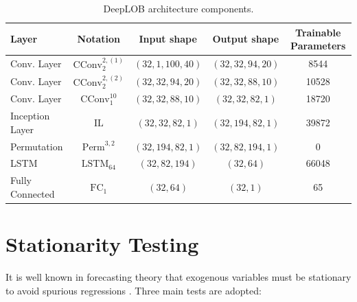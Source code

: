 \documentclass[10pt,a4paper,oneside]{article}
\DeclareMathOperator{\perm}{Perm}
\DeclareMathOperator{\fullyconnected}{FC}
\DeclareMathOperator{\lstm}{LSTM}
\begin{document}
\begin{table}[htb]
  \caption{DeepLOB architecture components.}
  \label{tab:deeplob}

\centering
\begin{tabular}{@{}lcccc@{}}
\toprule
Layer           & Notation           & Input shape        & Output shape          & Trainable Parameters  \\ \midrule
Conv. Layer     & $\mathrm{CConv}^{2, (1)}_{2}$ & $(32, 1, 100, 40)$ & $(32, 32, 94, 20)$   & 8544                  \\
Conv. Layer     & $\mathrm{CConv}^{2, (2)}_2$   & $(32, 32, 94, 20)$ & $(32,  32,  88, 10)$ & 10528                 \\
Conv. Layer     & $\mathrm{CConv}^{10}_1$       & $(32, 32, 88, 10)$ & $(32, 32, 82, 1)$    & 18720                 \\
Inception Layer & $\mathrm{IL}$               & $(32,  32, 82, 1)$ & $(32, 194, 82, 1)$   & 39872                 \\
Permutation     & $\perm^{3,2}$        & $(32, 194, 82, 1)$ & $(32, 82, 194, 1)$   & 0                     \\
LSTM            & $\lstm_{64}$        & $(32, 82, 194)$    & $(32, 64)$           & 66048                 \\ 
Fully Connected & $\fullyconnected_{1}$    & $(32, 64)$         & $(32, 1)$            & 65   \\\bottomrule
\end{tabular}

\end{table}



\clearpage
\section{Stationarity Testing}
\label{ap:stationarity_testing}

It is well known in forecasting theory that exogenous variables must be stationary to avoid spurious regressions \cite{xie2006spurious}. Three main tests are adopted:
\end{document}
